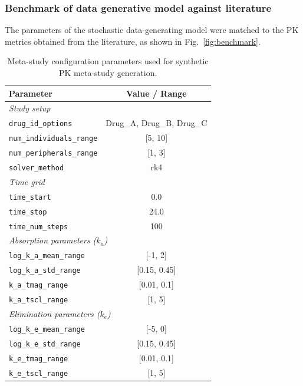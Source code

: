 \subsubsection{Benchmark of data generative model against literature}
\label{app:benchmark}

The parameters of the stochastic data-generating model were matched to the PK metrics obtained from the literature, as shown in Fig.~\ref{fig:benchmark}.


\begin{table}[h]
\centering
\caption{Meta-study configuration parameters used for synthetic PK meta-study generation.}
\label{tab:meta_study_config}
\begin{tabular}{lc}
\toprule
\textbf{Parameter} & \textbf{Value / Range} \\
\midrule

\multicolumn{2}{l}{\textit{Study setup}} \\
\texttt{drug\_id\_options}           & Drug\_A, Drug\_B, Drug\_C \\
\texttt{num\_individuals\_range}     & [5, 10] \\
\texttt{num\_peripherals\_range}     & [1, 3] \\
\texttt{solver\_method}              & rk4 \\

\midrule
\multicolumn{2}{l}{\textit{Time grid}} \\
\texttt{time\_start}                 & 0.0 \\
\texttt{time\_stop}                  & 24.0 \\
\texttt{time\_num\_steps}            & 100 \\

\midrule
\multicolumn{2}{l}{\textit{Absorption parameters ($k_a$)}} \\
\texttt{log\_k\_a\_mean\_range}      & [-1, 2] \\
\texttt{log\_k\_a\_std\_range}       & [0.15, 0.45] \\
\texttt{k\_a\_tmag\_range}           & [0.01, 0.1] \\
\texttt{k\_a\_tscl\_range}           & [1, 5] \\

\midrule
\multicolumn{2}{l}{\textit{Elimination parameters ($k_e$)}} \\
\texttt{log\_k\_e\_mean\_range}      & [-5, 0] \\
\texttt{log\_k\_e\_std\_range}       & [0.15, 0.45] \\
\texttt{k\_e\_tmag\_range}           & [0.01, 0.1] \\
\texttt{k\_e\_tscl\_range}           & [1, 5] \\


\end{tabular}
\end{table}
